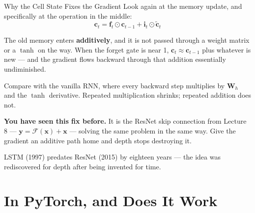 \documentclass[aspectratio=169, 11pt]{beamer}
\begin{document}
\begin{frame}{Why the Cell State Fixes the Gradient}
  Look again at the memory update, and specifically at the operation in the middle:
  \[
    \mathbf{c}_t = \mathbf{f}_t \odot \mathbf{c}_{t-1} + \mathbf{i}_t \odot \tilde{\mathbf{c}}_t
  \]
  \vspace{-0.3cm}

  The old memory enters \textbf{additively}, and it is not passed through a weight matrix or a
  $\tanh$ on the way. When the forget gate is near 1, $\mathbf{c}_t \approx \mathbf{c}_{t-1}$
  plus whatever is new --- and the gradient flows backward through that addition essentially
  undiminished.

  \vspace{0.15cm}
  Compare with the vanilla RNN, where every backward step multiplies by $\mathbf{W}_h$ and the
  $\tanh$ derivative. Repeated multiplication shrinks; repeated addition does not.

  \begin{keybox}
    \textbf{You have seen this fix before.} It is the ResNet skip connection from Lecture 8 ---
    $\mathbf{y} = \mathcal{F}(\mathbf{x}) + \mathbf{x}$ --- solving the same problem in the same
    way. Give the gradient an additive path home and depth stops destroying it.
  \end{keybox}

  LSTM (1997) predates ResNet (2015) by eighteen years --- the idea was rediscovered for depth
  after being invented for time.
\end{frame}

\section{In PyTorch, and Does It Work}

\end{document}
